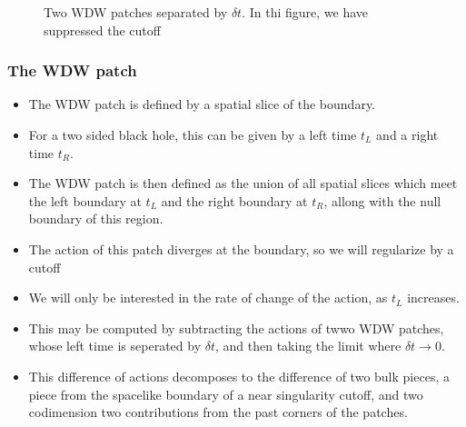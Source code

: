 \documentclass[8pt,aspectratio=169]{beamer}
\begin{document}
\begin{frame}
\begin{minipage}[t]{0.48\linewidth}
\begin{figure}
\begin{center}
    \end{center}
    \caption{Two WDW patches separated by $\delta t$.  In thi figure, we have suppressed the cutoff}
    \label{fig:2WDW}
\end{figure}

\end{minipage}

\end{frame}


\begin{frame}
\frametitle{The WDW patch}

\begin{minipage}[t]{0.5\linewidth}

\begin{itemize}

\item The WDW patch is defined by a spatial slice of the boundary. 

\item For a two sided black hole, this can be given by a left time $t_L$ and a right time $t_R$.

\item The WDW patch is then defined as the union of all spatial slices which meet the left boundary at $t_L$ and the right boundary at $t_R$, allong with the null boundary of this region.

\item The action of this patch diverges at the boundary, so we will regularize by a cutoff

\item We will only be interested in the rate of change of the action, as $t_L$ increases.

\item This may be computed by subtracting the actions of twwo WDW patches, whose left time is seperated by $\delta t$, and then taking the limit where $\delta t \rightarrow 0$.

\item This difference of actions decomposes to the difference of two bulk pieces, a piece from the spacelike boundary of a near singularity cutoff, and two codimension two contributions from the past corners of the patches.

\end{itemize}

\end{minipage}\hfill
%
\begin{minipage}[t]{0.48\linewidth}

\begin{figure}
    \begin{center}
    

\end{center}
\end{figure}
\end{minipage}
\end{frame}
\end{document}
